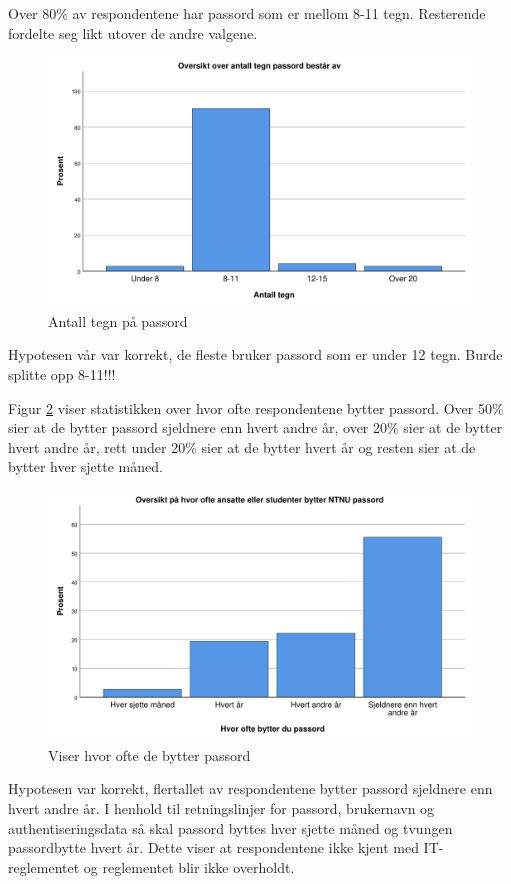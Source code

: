 Over 80\% av respondentene har passord som er mellom 8-11 tegn. Resterende fordelte seg likt utover de andre valgene. 
\begin{figure}[H]
    \centering
    \includegraphics[scale=0.5]{case_2/bilder/spss/antall_tegn.pdf}
    \caption[Antall tegn i passord]{Antall tegn på passord}
    \label{fig:case2-antalltegn}
\end{figure}
Hypotesen vår var korrekt, de fleste bruker passord som er under 12 tegn. Burde splitte opp 8-11!!!

Figur \ref{fig:case2-bytter-passord} viser statistikken over hvor ofte respondentene bytter passord. Over 50\% sier at de bytter passord sjeldnere enn hvert andre år, over 20\% sier at de bytter hvert andre år, rett under 20\% sier at de bytter hvert år og resten sier at de bytter hver sjette måned. 
\begin{figure}[H]
    \centering
    \includegraphics[scale=0.5]{case_2/bilder/spss/bytter_passord.pdf}
    \caption[Hvor ofte de bytter passord]{Viser hvor ofte de bytter passord}
    \label{fig:case2-bytter-passord}
\end{figure}
Hypotesen var korrekt, flertallet av respondentene bytter passord sjeldnere enn hvert andre år. I henhold til retningslinjer for passord, brukernavn og authentiseringsdata så skal passord byttes hver sjette måned og tvungen passordbytte hvert år. Dette viser at respondentene ikke kjent med IT-reglementet og reglementet blir ikke overholdt.

